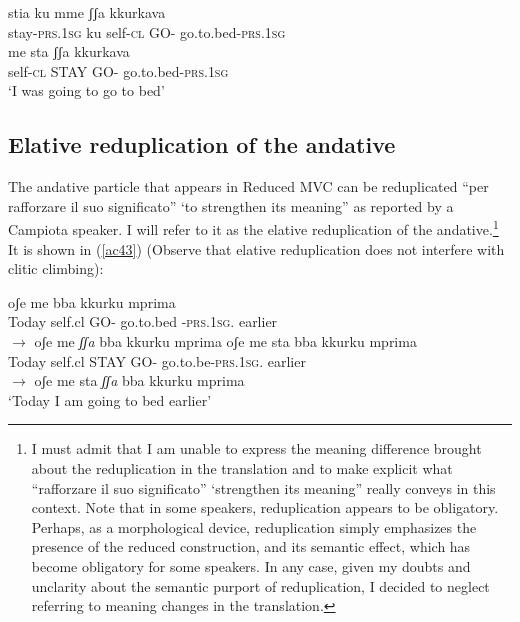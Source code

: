 \documentclass[output=paper]{langscibook}
\begin{document}
\ea \label{ac42}
    \ea \label{ac42a}\gll stia       ku mme   ʃʃa   kkurkava \\
    stay-\textsc{prs}.\textsc{1sg} ku self-\textsc{cl}  GO- go.to.bed-\textsc{prs}.\textsc{1sg}\\
    \ex \label{ac42b}\gll me    sta    ʃʃa   kkurkava\\
    self-\textsc{cl} STAY GO- go.to.bed-\textsc{prs}.\textsc{1sg}\\
    \glt ‘I was going to go to bed’
    \z
\z


\subsection{Elative reduplication of the andative}

The andative particle that appears in Reduced MVC can be reduplicated ``per rafforzare il suo significato'' ‘to strengthen its meaning” as reported by a Campiota speaker.  I will refer to it as the elative reduplication of the andative.\footnote{I must admit that I am unable to express the meaning difference brought about the reduplication in the translation and to make explicit what “rafforzare il suo significato” ‘strengthen its meaning” really conveys in this context.  Note that in some speakers, reduplication appears to be obligatory.  Perhaps, as a morphological device, reduplication simply emphasizes the presence of the reduced construction, and its semantic effect, which has become obligatory for some speakers. In any case, given my doubts and unclarity about the semantic purport of reduplication, I decided to neglect referring to meaning changes in the translation.}  It is shown in (\ref{ac43}) (Observe that elative reduplication does not interfere with clitic climbing):

\ea \label{ac43}
    \ea \label{ac43a}
        \ea \label{ac43ai}\gll oʃe    me      bba   kkurku         mprima\\
       Today self.cl    GO-   go.to.bed -\textsc{prs}.\textsc{1sg}.   earlier\\
        \ex \label{ac43aii}$\rightarrow$ oʃe    me    \textit{ʃʃa}  bba   kkurku         mprima
        \z
    \ex \label{ac43b}
        \ea \label{ac43bi}\gll oʃe    me   sta     bba  kkurku      mprima\\
       Today self.cl  STAY  GO-  go.to.be-\textsc{prs}.\textsc{1sg}.   earlier\\
        \ex   \label{ac43bii}$\rightarrow$ oʃe    me   sta   \textit{ʃʃa} bba  kkurku mprima\\
       ‘Today I am going to bed earlier’
        \z
    \z
\z
\end{document}
